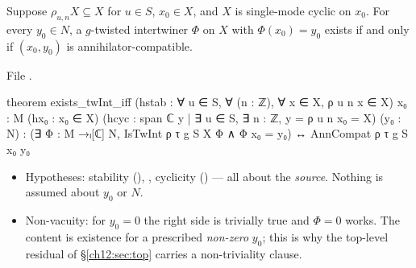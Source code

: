 \begin{theorem}\label{ch12:thm:exists_twInt_iff}
Suppose $\rho_{u,n}X\subseteq X$ for $u\in S$, $x_0\in X$, and $X$ is single-mode cyclic on $x_0$.  For
every $y_0\in N$, a $g$-twisted intertwiner $\Phi$ on $X$ with $\Phi(x_0)=y_0$ exists if and only if
$(x_0,y_0)$ is annihilator-compatible.
\end{theorem}
File .
\begin{leancode}
theorem exists_twInt_iff (hstab : ∀ u ∈ S, ∀ (n : ℤ), ∀ x ∈ X, ρ u n x ∈ X) {x₀ : M}
    (hx₀ : x₀ ∈ X) (hcyc : span ℂ {y | ∃ u ∈ S, ∃ n : ℤ, y = ρ u n x₀} = X) (y₀ : N) :
    (∃ Φ : M →ₗ[ℂ] N, IsTwInt ρ τ g S X Φ ∧ Φ x₀ = y₀) ↔ AnnCompat ρ τ g S x₀ y₀
\end{leancode}
\begin{dictionary}
\begin{itemize}
\item Hypotheses: stability (), , cyclicity () --- all about the
  \emph{source}.  Nothing is assumed about $y_0$ or $N$.
\item Non-vacuity: for $y_0=0$ the right side is trivially true and $\Phi=0$ works.  The content is
  existence for a prescribed \emph{non-zero} $y_0$; this is why the top-level residual of
  \S\ref{ch12:sec:top} carries a non-triviality clause.
\end{itemize}
\end{dictionary}

